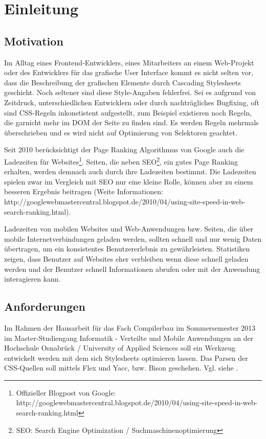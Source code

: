 \section{Einleitung}

\subsection{Motivation}
Im Alltag eines Frontend-Entwicklers, eines Mitarbeiters an einem Web-Projekt oder des Entwicklers für das grafische User Interface kommt es nicht selten vor, dass die Beschreibung der grafischen Elemente durch Cascading Stylesheets geschieht. Noch seltener sind diese Style-Angaben fehlerfrei. Sei es aufgrund von Zeitdruck, unterschiedlichen Entwicklern oder durch nachträgliches Bugfixing, oft sind CSS-Regeln inkonstistent aufgestellt, zum Beispiel existieren noch Regeln, die garnicht mehr im DOM der Seite zu finden sind. Es werden Regeln mehrmals überschrieben und es wird nicht auf Optimierung von Selektoren geachtet. 

Seit 2010 berücksichtigt der Page Ranking Algorithmus von Google auch die Ladezeiten für Websites\footnote{Offizieller Blogpost von Google: http://googlewebmastercentral.blogspot.de/2010/04/using-site-speed-in-web-search-ranking.html}. Seiten, die neben SEO\footnote{SEO: Search Engine Optimization / Suchmaschinenoptimierung}, ein gutes Page Ranking erhalten, werden demnach auch durch ihre Ladezeiten bestimmt. Die Ladezeiten spielen zwar im Vergleich mit SEO nur eine kleine Rolle, können aber zu einem besseren Ergebnis beitragen (Weite Informationen: http://googlewebmastercentral.blogspot.de/2010/04/using-site-speed-in-web-search-ranking.html).

Ladezeiten von mobilen Websites und Web-Anwendungen bzw. Seiten, die über mobile Internetverbindungen geladen werden, sollten schnell und nur wenig Daten übertragen, um ein konsistentes Benutzererlebnis zu gewährleisten. Statistiken zeigen, dass Benutzer auf Websites eher verbleiben wenn diese schnell geladen werden und der Benutzer schnell Informationen abrufen oder mit der Anwendung interagieren kann.

\subsection{Anforderungen}

Im Rahmen der Hausarbeit für das Fach Compilerbau im Sommersemester 2013 im Master-Studiengang Informatik - Verteilte und Mobile Anwendungen an der Hochschule Osnabrück / University of Applied Sciences soll ein Werkzeug entwickelt werden mit dem sich Stylesheets optimieren lassen. Das Parsen der CSS-Quellen soll mittels Flex und Yacc, bzw. Bison geschehen. Vgl. siehe \cite{appel_cc}.


